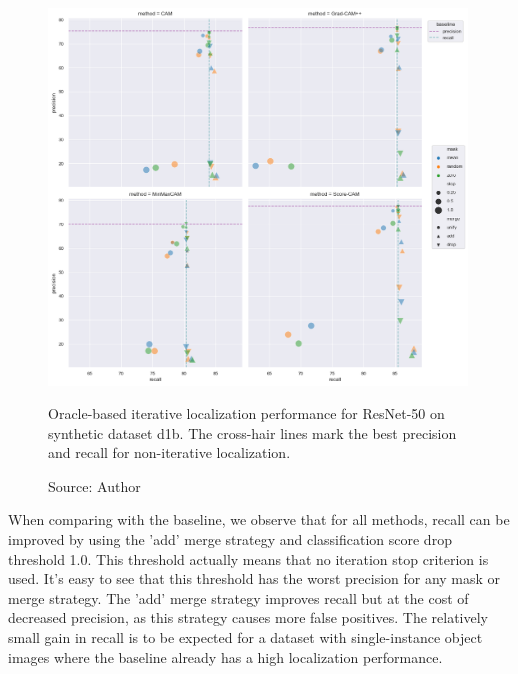 \begin{figure}[h]
    \begin{center}       
    \includegraphics[width=0.99\textwidth]{images/fig_iter_resnet50_syn_d1b.png}
    \caption[Oracle-based iterative localization performance for ResNet-50 on synthetic dataset d1b]{Oracle-based iterative localization performance for ResNet-50 on synthetic dataset d1b. The cross-hair lines mark the best precision and recall for non-iterative localization.}
    \caption*{Source: Author}
    \label{fig:prec_iter_resnet50_syn_d1b}
    \end{center}
\end{figure}

When comparing with the baseline, we observe that for all methods, recall can be improved by using the 'add' merge strategy and classification score drop threshold 1.0. This threshold actually means that no iteration stop criterion is used. It's easy to see that this threshold has the worst precision for any mask or merge strategy. The 'add' merge strategy improves recall but at the cost of decreased precision, as this strategy causes more false positives. The relatively small gain in recall is to be expected for a dataset with single-instance object images where the baseline already has a high localization performance.

